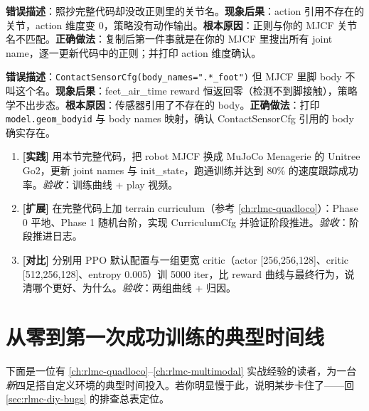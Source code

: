 \begin{pitfall}
\textbf{错误描述}：照抄完整代码却没改正则里的关节名。\textbf{现象后果}：action 引用不存在的关节，action 维度变 0，策略没有动作输出。\textbf{根本原因}：正则与你的 MJCF 关节名不匹配。\textbf{正确做法}：复制后第一件事就是在你的 MJCF 里搜出所有 joint name，逐一更新代码中的正则；并打印 action 维度确认。
\end{pitfall}

\begin{pitfall}
\textbf{错误描述}：\verb|ContactSensorCfg(body_names=".*_foot")| 但 MJCF 里脚 body 不叫这个名。\textbf{现象后果}：feet\_air\_time reward 恒返回零（检测不到脚接触），策略学不出步态。\textbf{根本原因}：传感器引用了不存在的 body。\textbf{正确做法}：打印 \verb|model.geom_bodyid| 与 body names 映射，确认 ContactSensorCfg 引用的 body 确实存在。
\end{pitfall}

\begin{practice}[完整代码综合]
\begin{enumerate}
\item \textbf{[实践]} 用本节完整代码，把 robot MJCF 换成 MuJoCo Menagerie 的 Unitree Go2，更新 joint names 与 init\_state，跑通训练并达到 $80\%$ 的速度跟踪成功率。\emph{验收}：训练曲线 + play 视频。
\item \textbf{[扩展]} 在完整代码上加 terrain curriculum（参考 \cref{ch:rlmc-quadloco}）：Phase 0 平地、Phase 1 随机台阶，实现 CurriculumCfg 并验证阶段推进。\emph{验收}：阶段推进日志。
\item \textbf{[对比]} 分别用 PPO 默认配置与一组更宽 critic（actor [256,256,128]、critic [512,256,128]、entropy 0.005）训 5000 iter，比 reward 曲线与最终行为，说清哪个更好、为什么。\emph{验收}：两组曲线 + 归因。
\end{enumerate}
\end{practice}

\section{从零到第一次成功训练的典型时间线}
\label{sec:rlmc-diy-timeline}

下面是一位有 \cref{ch:rlmc-quadloco}--\cref{ch:rlmc-multimodal} 实战经验的读者，为一台\emph{新}四足搭自定义环境的典型时间投入。若你明显慢于此，说明某步卡住了——回 \cref{sec:rlmc-diy-bugs} 的排查总表定位。

